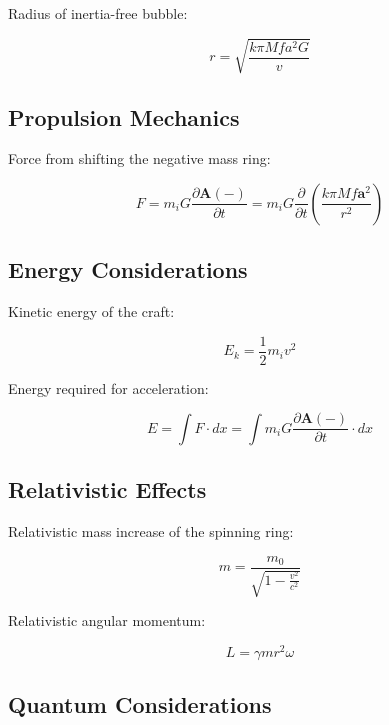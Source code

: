 \documentclass{article}
\begin{document}
Radius of inertia-free bubble:

\begin{equation}
    r = \sqrt{\frac{k\pi M f a^2 G}{v}}
\end{equation}

\subsection{Propulsion Mechanics}

Force from shifting the negative mass ring:

\begin{equation}
    F = m_i G \frac{\partial \mathbf{A}(-)}{\partial t} = m_i G \frac{\partial}{\partial t} \left(\frac{k\pi M f \mathbf{a}^2}{r^2}\right)
\end{equation}

\subsection{Energy Considerations}

Kinetic energy of the craft:

\begin{equation}
    E_k = \frac{1}{2}m_i v^2
\end{equation}

Energy required for acceleration:

\begin{equation}
    E = \int F \cdot dx = \int m_i G \frac{\partial \mathbf{A}(-)}{\partial t} \cdot dx
\end{equation}

\subsection{Relativistic Effects}

Relativistic mass increase of the spinning ring:

\begin{equation}
    m = \frac{m_0}{\sqrt{1-\frac{v^2}{c^2}}}
\end{equation}

Relativistic angular momentum:

\begin{equation}
    L = \gamma m r^2 \omega
\end{equation}

\subsection{Quantum Considerations}
\end{document}
